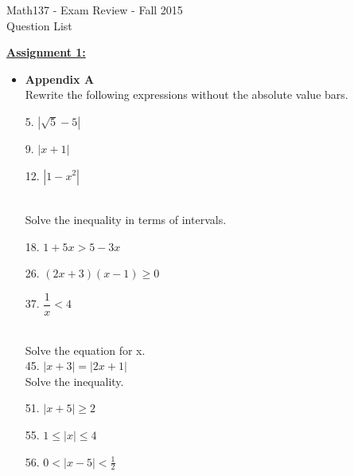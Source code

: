 \documentclass{letter}
\begin{document}
	\begin{center}
		\LARGE Math137 - Exam Review - Fall 2015\\
		\large Question List
	\end{center}
	\vspace{0.25 in}
	
	\large\underline{\textbf{Assignment 1:}}
	\begin{itemize}
		\item[] \textbf{Appendix A}\\
		
		Rewrite the following expressions without the absolute value bars.\\
		\begin{minipage}[t]{0.3\textwidth}
			5. $|\sqrt5 - 5|$
		\end{minipage}
		\begin{minipage}[t]{0.3\textwidth}
			9. $|x+1|$
		\end{minipage}
		\begin{minipage}[t]{0.3\textwidth}
			12. $|1-x^2|$
		\end{minipage}\\
		
		Solve the inequality in terms of intervals.\\
		\begin{minipage}[t]{0.3\textwidth}
			18. $1+5x > 5-3x$
		\end{minipage}
		\begin{minipage}[t]{0.3\textwidth}
			26. $(2x+3)(x-1) \geq 0$
		\end{minipage}
		\begin{minipage}[t]{0.3\textwidth}
			37. $\dfrac{1}{x} < 4$
		\end{minipage}\\
		
		Solve the equation for x.\\
		45. $|x+3| = |2x+1|$\\
		
		Solve the inequality.\\
		\begin{minipage}[t]{0.3\textwidth}
			51. $|x+5| \geq 2$
		\end{minipage}
		\begin{minipage}[t]{0.3\textwidth}
			55. $1 \leq |x| \leq  4$
		\end{minipage}
		\begin{minipage}[t]{0.3\textwidth}
			56. $0 < |x-5| < \frac12$
		\end{minipage}\\
		

\end{itemize}
\end{document}
